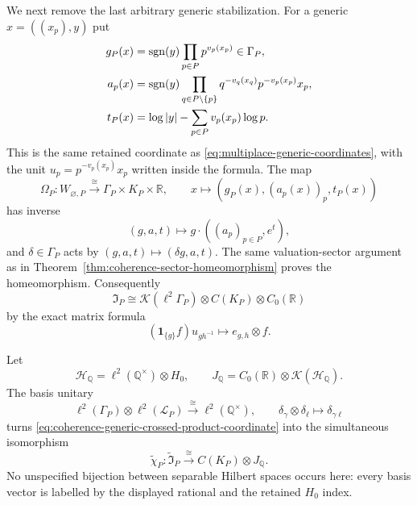 We next remove the last arbitrary generic stabilization.  For a generic
$x=((x_p),y)$ put
\begin{align}
 g_P(x)&=\operatorname{sgn}(y)\prod_{p\in P}p^{v_p(x_p)}\in\Gamma_P,
 \notag\\
 a_p(x)&=\operatorname{sgn}(y)
 \prod_{q\in P\setminus\{p\}}q^{-v_q(x_q)}
 p^{-v_p(x_p)}x_p,
 \notag\\
 t_P(x)&=\log|y|-\sum_{p\in P}v_p(x_p)\log p.
 \label{eq:coherence-generic-complete-coordinates}
\end{align}
This is the same retained coordinate as
\eqref{eq:multiplace-generic-coordinates}, with the unit
$u_p=p^{-v_p(x_p)}x_p$ written inside the formula.  The map
\begin{equation}
 \Omega_P:W_{\varnothing,P}\xrightarrow{\ \cong\ }
 \Gamma_P\times K_P\times\mathbb R,
 \qquad x\longmapsto(g_P(x),(a_p(x))_p,t_P(x))
 \label{eq:coherence-generic-homeomorphism}
\end{equation}
has inverse
\begin{equation}
 (g,a,t)\longmapsto g\cdot((a_p)_{p\in P},e^t),
 \label{eq:coherence-generic-homeomorphism-inverse}
\end{equation}
and $\delta\in\Gamma_P$ acts by
$(g,a,t)\mapsto(\delta g,a,t)$.  The same valuation-sector argument as in
Theorem~\ref{thm:coherence-sector-homeomorphism} proves the homeomorphism.
Consequently
\begin{equation}
 \mathfrak I_P\cong
 \mathcal K(\ell^2\Gamma_P)\otimes C(K_P)\otimes C_0(\mathbb R)
 \label{eq:coherence-generic-crossed-product-coordinate}
\end{equation}
by the exact matrix formula
\[
 (\mathbf1_{\{g\}}f)u_{gh^{-1}}\longmapsto e_{g,h}\otimes f.
\]

Let
\begin{equation}
 \mathcal H_{\mathbb Q}=\ell^2(\mathbb Q^\times)\otimes H_0,
 \qquad
 J_{\mathbb Q}=C_0(\mathbb R)\otimes\mathcal K(\mathcal H_{\mathbb Q}).
 \label{eq:coherence-universal-ideal}
\end{equation}
The basis unitary
\begin{equation}
 \ell^2(\Gamma_P)\otimes\ell^2(\mathcal L_P)
 \xrightarrow{\ \cong\ }\ell^2(\mathbb Q^\times),
 \qquad \delta_\gamma\otimes\delta_\ell\longmapsto\delta_{\gamma\ell}
 \label{eq:coherence-rational-basis-unitary}
\end{equation}
turns \eqref{eq:coherence-generic-crossed-product-coordinate} into the
simultaneous isomorphism
\begin{equation}
 \widetilde\chi_P:\widetilde{\mathfrak I}_P
 \xrightarrow{\ \cong\ } C(K_P)\otimes J_{\mathbb Q}.
 \label{eq:coherence-simultaneous-generic-coordinate}
\end{equation}
No unspecified bijection between separable Hilbert spaces occurs here: every
basis vector is labelled by the displayed rational and the retained $H_0$
index.

